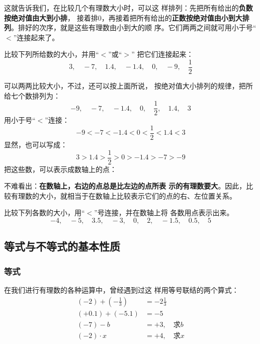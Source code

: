   这就告诉我们，在比较几个有理数大小时，可以这
样排列：先把所有给出的\textbf{负数按绝对值由大到小排}，
接着排0，再接着把所有给出的\textbf{正数按绝对值由小到大排
列}。排好的次序，就是这些有理数由小到大的顺
序。它们两两之间就可用小于号“$<$”连接起来了。

\begin{example}
 比较下列所给数的大小，并用“$<$”或“$>$”
把它们连接起来：   
\[3,\quad -7,\quad 1.4,\quad -1.4,\quad 0,\quad -9,\quad \frac{1}{2} \]
\end{example}

\begin{solution}
 可以两两比较大小，不过，还可以按上面所说，
    按绝对值大小排列的规律，把所给七个数排列为：
\[-9,\quad -7,\quad -1.4,\quad 0,\quad \frac{1}{2},\quad 1.4,\quad 3  \]
用小于号“$<$”连接：
\[-9<-7<-1.4<0< \frac{1}{2}< 1.4<3  \]
显然，也可以写成：
\[3>1.4>\frac{1}{2}>0>-1.4>-7>-9 \]
把这些数，可以表示成数轴上的点：
\begin{figure}[htp]
    \centering
    \caption{}
\end{figure}
\end{solution}

不难看出：\textbf{在数轴上，右边的点总是比左边的点所表
示的有理数要大}。因此，比较有理数的大小，就相当于在数轴上比较表示它们的点的右、左位置关系。

\begin{ex}
    比较下列各数的大小，用“$<$”号连接，并在数轴上将
    各数用点表示出来。
    \[-4,\quad -5,\quad 3.5,\quad -3,\quad 0,\quad 2,\quad -1.5,\quad 0.5,\quad 5  \]
\end{ex}

\subsection{等式与不等式的基本性质}
\subsubsection{等式}
在我们进行有理数的各种运算中，曾经遇到过这
样用等号联结的两个算式：
\[\begin{split}
(-2)+\left(-\frac{1}{3}\right) &=-2\frac{1}{3}\\
(+0.1)+(-5.1)&=-5\\
(-7)-b&=+3,\quad \text{求$b$}    \\
(-2)\cdot x&=+4,\quad \text{求$x$}    \\
\end{split}\]

